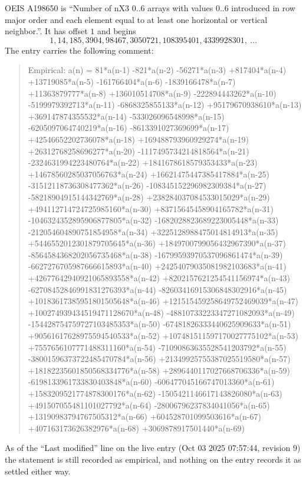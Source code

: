 \documentclass[11pt,a4paper]{article}
\theoremstyle{plain}
\theoremstyle{definition}
\begin{document}
OEIS A198650 is ``Number of nX3 0..6 arrays with values 0..6 introduced in row major order and each element equal to at least one horizontal or vertical neighbor.''. It has offset $1$ and begins
\[
1, 14, 185, 3904, 98467, 3050721, 108395401, 4339928301,\ \dots
\]
The entry carries the following comment:
\begin{quote}\small
Empirical: a(n) = 81*a(n-1) -821*a(n-2) -56271*a(n-3) +817404*a(n-4) +13719085*a(n-5) -161766404*a(n-6) -1839166478*a(n-7) +11363879777*a(n-8) +136010514708*a(n-9) -222894443262*a(n-10) -5199979392713*a(n-11) -6868325855133*a(n-12) +95179670938610*a(n-13) +369147874355532*a(n-14) -533026096548998*a(n-15) -6205097064740219*a(n-16) -8613391027369699*a(n-17) +42546652202736078*a(n-18) +169488793960929274*a(n-19) +26312768258696277*a(n-20) -1117495734214818564*a(n-21) -2324631994223480764*a(n-22) +1841678618579353433*a(n-23) +14678560285037056763*a(n-24) +16621475447385417884*a(n-25) -31512118736308477362*a(n-26) -108345152296982309384*a(n-27) -58218904915144342769*a(n-28) +238284037084533015029*a(n-29) +494112714724725985160*a(n-30) +83715645458904165782*a(n-31) -1046324352895906877805*a(n-32) -1682028823689223005448*a(n-33) -212054604890751854958*a(n-34) +3225128988475014814913*a(n-35) +5446552012301879705645*a(n-36) +1849700799056432967390*a(n-37) -8564584368202056735468*a(n-38) -16799593970537096861474*a(n-39) -6627276705987666615893*a(n-40) +24254079035081982103683*a(n-41) +42677642940921065893558*a(n-42) +8202157621254541156974*a(n-43) -62708452846991831276393*a(n-44) -82603416915306848302916*a(n-45) +10183617385951801505648*a(n-46) +121515459258649752469039*a(n-47) +100274939434519471128670*a(n-48) -48810733223347271082093*a(n-49) -154428754759727103485353*a(n-50) -67481826333440625909633*a(n-51) +90561617628975594540533*a(n-52) +107481511597170027775102*a(n-53) +7557656107771488311160*a(n-54) -71090863635528541203792*a(n-55) -38001596373722485470784*a(n-56) +21349925755387025519580*a(n-57) +18182235601850568334776*a(n-58) +2896440117027668706336*a(n-59) -6198133961733830403848*a(n-60) -606477045166747013360*a(n-61) +1583209521774878300176*a(n-62) -1505421146617143826080*a(n-63) +491507055481101027792*a(n-64) -28006796237834041056*a(n-65) +13190983794767505312*a(n-66) +604528701099503616*a(n-67) +407163173626382976*a(n-68) +3069878917501440*a(n-69)
\end{quote}
As of the ``Last modified'' line on the live entry (Oct 03 2025 07:57:44, revision 9) the statement is
still recorded as empirical, and nothing on the entry records it as settled either way.
\end{document}
